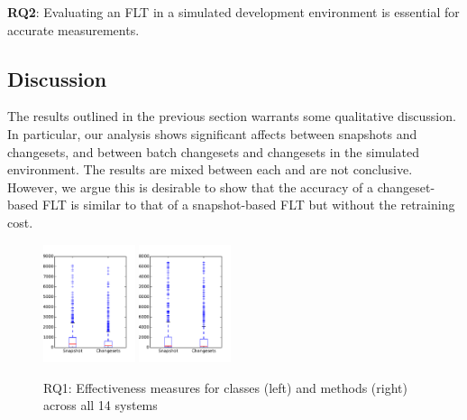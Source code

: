 \begin{framed}
    \textbf{RQ2}:
    Evaluating an FLT in a simulated development environment is essential for
    accurate measurements.
\end{framed}



\subsection{Discussion}

The results outlined in the previous section warrants some qualitative
discussion.  In particular, our analysis shows significant affects between
snapshots and changesets, and between batch changesets and changesets in the simulated environment.
The results are mixed between each and are not conclusive.  However, we argue
this is desirable to show that the accuracy of a changeset-based FLT is similar
to that of a snapshot-based FLT but without the retraining cost.

\begin{figure}[t]
\centering
\includegraphics[width=0.24\textwidth]{figures/rq1-overall-class}
\includegraphics[width=0.24\textwidth]{figures/rq1-overall-method}
\caption{RQ1: Effectiveness measures for classes (left) and methods (right) across all 14 systems}
\label{fig:em}
\end{figure}

